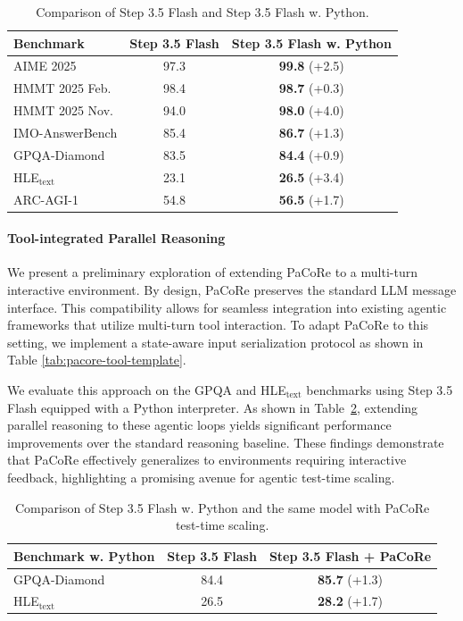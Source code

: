 \begin{table}[h]
\centering
\begin{tabular}{lcc}
\toprule
\rowcolor{header_gray}
\textbf{Benchmark} & \textbf{Step 3.5 Flash} & \textbf{Step 3.5 Flash w. Python} \\
\midrule
AIME 2025           & 97.3 & \textbf{99.8} (+2.5) \\
HMMT 2025 Feb.      & 98.4 & \textbf{98.7} (+0.3) \\
HMMT 2025 Nov.      & 94.0 & \textbf{98.0} (+4.0) \\
IMO-AnswerBench      & 85.4 & \textbf{86.7} (+1.3) \\
GPQA-Diamond        & 83.5 & \textbf{84.4} (+0.9) \\
HLE$_{\text{text}}$ & 23.1 & \textbf{26.5} (+3.4) \\
ARC-AGI-1           & 54.8 & \textbf{56.5} (+1.7) \\
\bottomrule
\end{tabular}
\caption{Comparison of Step 3.5 Flash and Step 3.5 Flash w. Python.}
\label{tab:tir-results}
\end{table}

\paragraph{Tool-integrated Parallel Reasoning}
We present a preliminary exploration of extending PaCoRe to a multi-turn interactive environment.
By design, PaCoRe preserves the standard LLM message interface. This compatibility allows for seamless integration into existing agentic frameworks that utilize multi-turn tool interaction.
To adapt PaCoRe to this setting, we implement a state-aware input serialization protocol as shown in Table \ref{tab:pacore-tool-template}.

We evaluate this approach on the GPQA and HLE$_{\text{text}}$ benchmarks using Step 3.5 Flash equipped with a Python interpreter. As shown in Table~\ref{tab:tool-results}, extending parallel reasoning to these agentic loops yields significant performance improvements over the standard reasoning baseline. These findings demonstrate that PaCoRe effectively generalizes to environments requiring interactive feedback, highlighting a promising avenue for agentic test-time scaling.

\begin{table}[h]
\centering
\begin{tabular}{lcc}
\toprule
\rowcolor{header_gray}
\textbf{Benchmark w. Python} & \textbf{Step 3.5 Flash} & \textbf{Step 3.5 Flash + PaCoRe} \\
\midrule
GPQA-Diamond        & 84.4 & \textbf{85.7} (+1.3) \\
HLE$_{\text{text}}$ & 26.5 & \textbf{28.2} (+1.7) \\
\bottomrule
\end{tabular}
\caption{Comparison of Step 3.5 Flash w. Python and the same model with PaCoRe test-time scaling.}
\label{tab:tool-results}
\end{table}

